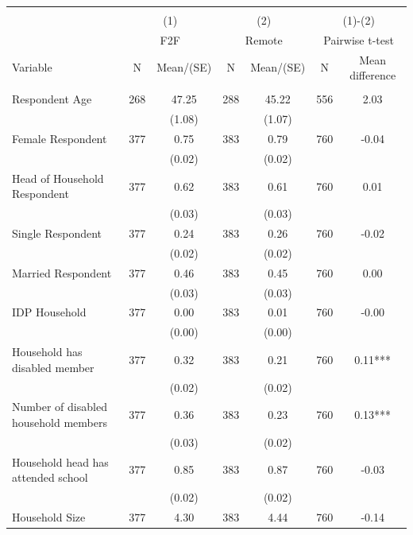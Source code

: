 \begin{tabular}{@{\extracolsep{5pt}}lcccccc}
\\[-1.8ex]\hline \hline \\[-1.8ex]
 & \multicolumn{2}{c}{(1)}  & \multicolumn{2}{c}{(2)}  & \multicolumn{2}{c}{(1)-(2)} \\
 & \multicolumn{2}{c}{F2F}  & \multicolumn{2}{c}{Remote}  & \multicolumn{2}{c}{Pairwise t-test}  \\
Variable & N & Mean/(SE) & N & Mean/(SE) & N & Mean difference \\ \hline \\[-1.8ex] 
Respondent Age   & 268    & 47.25    & 288    & 45.22    & 556    & 2.03   \\
 &   & (1.08)  &   & (1.07)  &   &  \\ [1ex]
Female Respondent   & 377    & 0.75    & 383    & 0.79    & 760    & -0.04   \\
 &   & (0.02)  &   & (0.02)  &   &  \\ [1ex]
Head of Household Respondent   & 377    & 0.62    & 383    & 0.61    & 760    & 0.01   \\
 &   & (0.03)  &   & (0.03)  &   &  \\ [1ex]
Single Respondent   & 377    & 0.24    & 383    & 0.26    & 760    & -0.02   \\
 &   & (0.02)  &   & (0.02)  &   &  \\ [1ex]
Married Respondent   & 377    & 0.46    & 383    & 0.45    & 760    & 0.00   \\
 &   & (0.03)  &   & (0.03)  &   &  \\ [1ex]
IDP Household   & 377    & 0.00    & 383    & 0.01    & 760    & -0.00   \\
 &   & (0.00)  &   & (0.00)  &   &  \\ [1ex]
Household has disabled member   & 377    & 0.32    & 383    & 0.21    & 760    & 0.11***   \\
 &   & (0.02)  &   & (0.02)  &   &  \\ [1ex]
Number of disabled household members   & 377    & 0.36    & 383    & 0.23    & 760    & 0.13***   \\
 &   & (0.03)  &   & (0.02)  &   &  \\ [1ex]
Household head has attended school   & 377    & 0.85    & 383    & 0.87    & 760    & -0.03   \\
 &   & (0.02)  &   & (0.02)  &   &  \\ [1ex]
Household Size   & 377    & 4.30    & 383    & 4.44    & 760    & -0.14   \\

\end{tabular}
